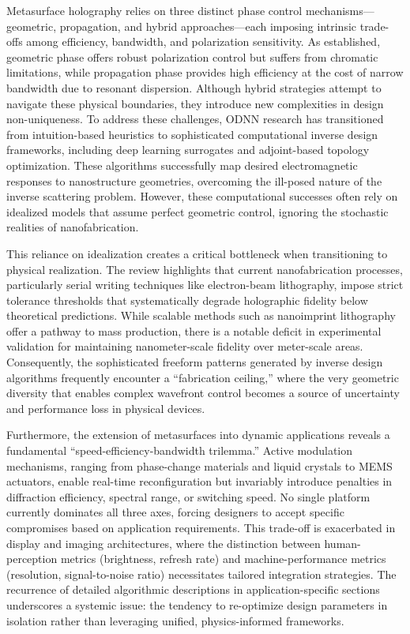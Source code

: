\documentclass[11pt]{article}
\begin{document}
Metasurface holography relies on three distinct phase control mechanisms---geometric, propagation, and hybrid approaches---each imposing intrinsic trade-offs among efficiency, bandwidth, and polarization sensitivity. As established, geometric phase offers robust polarization control but suffers from chromatic limitations, while propagation phase provides high efficiency at the cost of narrow bandwidth due to resonant dispersion. Although hybrid strategies attempt to navigate these physical boundaries, they introduce new complexities in design non-uniqueness. To address these challenges, ODNN research has transitioned from intuition-based heuristics to sophisticated computational inverse design frameworks, including deep learning surrogates and adjoint-based topology optimization. These algorithms successfully map desired electromagnetic responses to nanostructure geometries, overcoming the ill-posed nature of the inverse scattering problem. However, these computational successes often rely on idealized models that assume perfect geometric control, ignoring the stochastic realities of nanofabrication.

This reliance on idealization creates a critical bottleneck when transitioning to physical realization. The review highlights that current nanofabrication processes, particularly serial writing techniques like electron-beam lithography, impose strict tolerance thresholds that systematically degrade holographic fidelity below theoretical predictions. While scalable methods such as nanoimprint lithography offer a pathway to mass production, there is a notable deficit in experimental validation for maintaining nanometer-scale fidelity over meter-scale areas. Consequently, the sophisticated freeform patterns generated by inverse design algorithms frequently encounter a ``fabrication ceiling,'' where the very geometric diversity that enables complex wavefront control becomes a source of uncertainty and performance loss in physical devices.

Furthermore, the extension of metasurfaces into dynamic applications reveals a fundamental ``speed-efficiency-bandwidth trilemma.'' Active modulation mechanisms, ranging from phase-change materials and liquid crystals to MEMS actuators, enable real-time reconfiguration but invariably introduce penalties in diffraction efficiency, spectral range, or switching speed. No single platform currently dominates all three axes, forcing designers to accept specific compromises based on application requirements. This trade-off is exacerbated in display and imaging architectures, where the distinction between human-perception metrics (brightness, refresh rate) and machine-performance metrics (resolution, signal-to-noise ratio) necessitates tailored integration strategies. The recurrence of detailed algorithmic descriptions in application-specific sections underscores a systemic issue: the tendency to re-optimize design parameters in isolation rather than leveraging unified, physics-informed frameworks.
\end{document}
